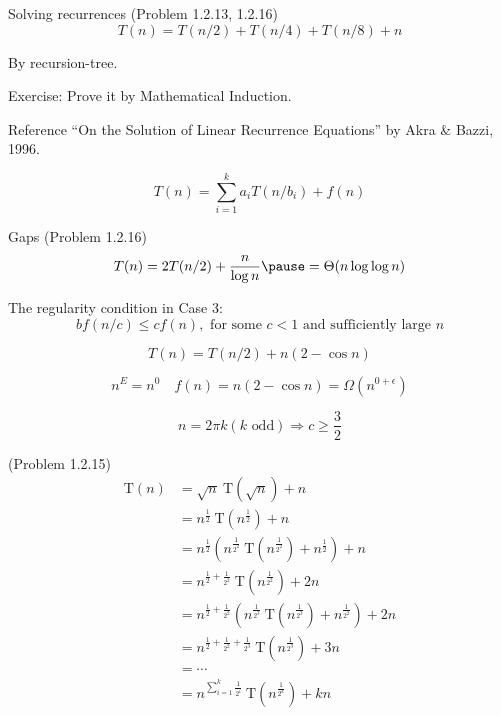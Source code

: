 \begin{frame}{Solving recurrences (Problem 1.2.13, 1.2.16)}
  \[
	T(n) = T(n/2) + T(n/4) + T(n/8) + n
  \]

  \pause
  \vspace{0.30cm}
  \centerline{By recursion-tree.}

  \pause
  \vspace{0.50cm}
  
  \centerline{Exercise: Prove it by Mathematical Induction.}

  \pause
  \begin{alertblock}{Reference}
	``On the Solution of Linear Recurrence Equations'' by Akra \& Bazzi, 1996.

	\[
	  T(n) = \sum_{i=1}^{k} a_i T(n/b_i) + f(n)
	\]
  \end{alertblock}
\end{frame}
\begin{frame}{Gaps (Problem 1.2.16)}
  \[
	T(n) = 2T(n/2) + \frac{n}{\log n} \pause = \Theta(n \log \log n)
  \]

  \pause

  The regularity condition in Case 3:
  \[
	bf(n/c) \le cf(n), \text{ for some } c < 1 \text{ and sufficiently large } n
  \]

  \[
	T(n) = T(n/2) + n(2 - \cos n)
  \]

  \[
	n^{E} = n^0 \quad f(n) = n(2 - \cos n) = \Omega(n^{0 + \epsilon})
  \]

  \pause
  \[
	n = 2\pi k (k \text{ odd}) \Rightarrow c \ge \frac{3}{2}
  \]
\end{frame}
\begin{frame}{(Problem 1.2.15)}
  \begin{align*} 
	\text{T}(n) &= \sqrt{n}\ \text{T}(\sqrt{n})+n \\
		&= n^{\frac{1}{2}}\ \text{T}\left(n^{\frac{1}{2}} \right )+n \\
		&= n^{\frac{1}{2}}\left( n^{\frac{1}{2^2}}\ \text{T}\left(n^{\frac{1}{2^2}} \right )+n^{\frac{1}{2}} \right )+n\\
		&= n^{\frac{1}{2}+\frac{1}{2^2}}\ \text{T}\left(n^{\frac{1}{2^2}}\right ) +2n\\
		&= n^{\frac{1}{2}+\frac{1}{2^2}}\left(n^{\frac{1}{2^3}}\ \text{T}\left(n^{\frac{1}{2^3}}\right ) +n^{\frac{1}{2^2}} \right )+2n\\
		&= n^{\frac{1}{2}+\frac{1}{2^2}+\frac{1}{2^3}}\ \text{T}\left(n^{\frac{1}{2^3}}\right ) +3n\\ 
		&= \cdots \\ 
		&= n^{\sum_{i=1}^{k}\frac{1}{2^i}}\ \text{T}\left(n^{\frac{1}{2^k}}\right ) +kn\\ 
  \end{align*}
\end{frame}
